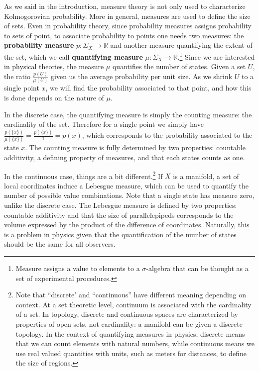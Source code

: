 \documentclass[10pt,twocolumn, nofootinbib]{revtex4-2}
\begin{document}
As we said in the introduction, measure theory is not only used to characterize Kolmogorovian probability. More in general, measures are used to define the size of sets. Even in probability theory, since probability measures assigns probability to sets of point, to associate probability to points one needs two measures: the \textbf{probability measure} $p : \Sigma_X \to \mathbb{R}$ and another measure quantifying the extent of the set, which we call \textbf{quantifying measure} $\mu : \Sigma_X \to \mathbb{R}$.\footnote{Measure assigns a value to elements to a $\sigma$-algebra that can be thought as a set of experimental procedures.} Since we are interested in physical theories, the measure $\mu$ quantifies the number of states. Given a set $U$, the ratio $\frac{p(U)}{\mu(U)}$ given us the average probability per unit size. As we shrink $U$ to a single point $x$, we will find the probability associated to that point, and how this is done depends on the nature of $\mu$. 

In the discrete case, the quantifying measure is simply the counting measure: the cardinality of the set. Therefore for a single point we simply have $\frac{p(\{x\})}{\mu(\{x\})} = \frac{p(\{x\})}{1} = p(x)$, which corresponds to the probability associated to the state $x$. The counting measure is fully determined by two properties: countable additivity, a defining property of measures, and that each states counts as one.

In the continuous case, things are a bit different.\footnote{Note that ``discrete' and ``continuous'' have different meaning depending on context. At a set theoretic level, continuum is associated with the cardinality of a set. In topology, discrete and continuous spaces are characterized by  properties of open sets, not cardinality: a manifold can be given a discrete topology. In the context of quantifying measures in physics, discrete means that we can count elements with natural numbers, while continuous means we use real valued quantities with units, such as meters for distances, to define the size of regions.} If $X$ is a manifold, a set of local coordinates induce a Lebesgue measure, which can be used to quantify the number of possible value combinations. Note that a single state has measure zero, unlike the discrete case. The Lebesgue measure is defined by two properties: countable additivity and that the size of parallelepipeds corresponds to the volume expressed by the product of the difference of coordinates. Naturally, this is a problem in physics given that the quantification of the number of states should be the same for all observers.
\end{document}
